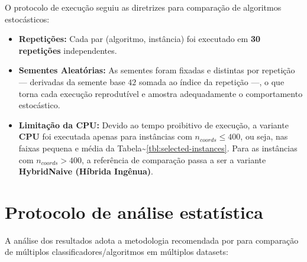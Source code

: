 O protocolo de execução seguiu as diretrizes para comparação de algoritmos estocásticos:

\begin{itemize}
  \tightlist
  \item
        \textbf{Repetições:} Cada par (algoritmo, instância) foi executado em \textbf{30 repetições} independentes.
  \item
        \textbf{Sementes Aleatórias:} As sementes foram fixadas e distintas por repetição --- derivadas da semente base \(42\) somada ao índice da repetição ---, o que torna cada execução reprodutível e amostra adequadamente o comportamento estocástico.
  \item
        \textbf{Limitação da CPU:} Devido ao tempo proibitivo de execução, a variante \textbf{CPU} foi executada apenas para instâncias com \(n_{coords} \le 400\), ou seja, nas faixas pequena e média da Tabela\textasciitilde{}\ref{tbl:selected-instances}.
        Para as instâncias com \(n_{coords} > 400\), a referência de comparação passa a ser a variante \textbf{HybridNaive (Híbrida Ingênua)}.
\end{itemize}

\section{Protocolo de análise estatística}\label{sec-34-protocolo-estatistico}

A análise dos resultados adota a metodologia recomendada por \textcite{demsar2006statistical} para comparação de múltiplos classificadores/algoritmos em múltiplos datasets:

